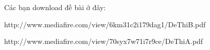 Các bạn download đề bài ở đây:  

   http://www.mediafire.com/view/6km31c2i179dag1/DeThiB.pdf  

   http://www.mediafire.com/view/70syx7w71i7r9ce/DeThiA.pdf